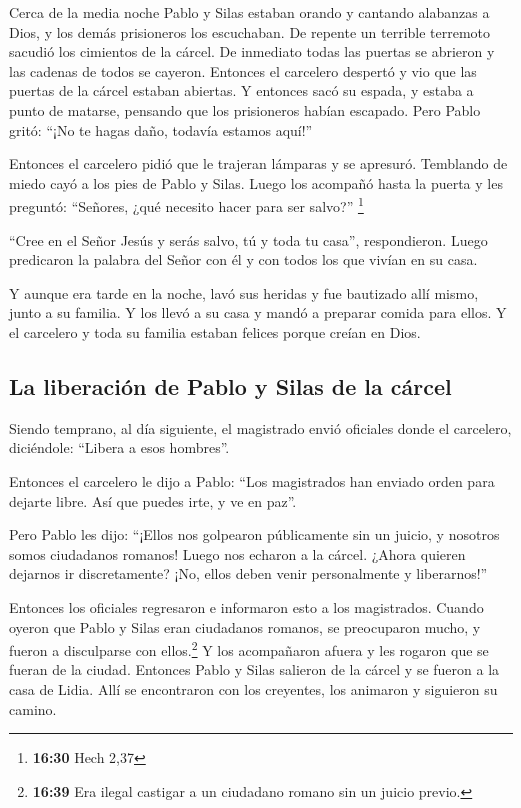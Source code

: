  Cerca de la media noche Pablo y Silas estaban orando y
cantando alabanzas a Dios, y los demás prisioneros los escuchaban.
 De repente un terrible terremoto sacudió los cimientos
de la cárcel. De inmediato todas las puertas se abrieron y las cadenas
de todos se cayeron.  Entonces el carcelero despertó y
vio que las puertas de la cárcel estaban abiertas. Y entonces sacó su
espada, y estaba a punto de matarse, pensando que los prisioneros habían
escapado.  Pero Pablo gritó: ``¡No te hagas daño, todavía
estamos aquí!''

 Entonces el carcelero pidió que le trajeran lámparas y
se apresuró. Temblando de miedo cayó a los pies de Pablo y Silas.
 Luego los acompañó hasta la puerta y les preguntó:
``Señores, ¿qué necesito hacer para ser salvo?'' \footnote{\textbf{16:30}
  Hech 2,37}

 ``Cree en el Señor Jesús y serás salvo, tú y toda tu
casa'', respondieron.  Luego predicaron la palabra del
Señor con él y con todos los que vivían en su casa.

 Y aunque era tarde en la noche, lavó sus heridas y fue
bautizado allí mismo, junto a su familia.  Y los llevó a
su casa y mandó a preparar comida para ellos. Y el carcelero y toda su
familia estaban felices porque creían en Dios.

\hypertarget{la-liberaciuxf3n-de-pablo-y-silas-de-la-cuxe1rcel}{%
\subsection{La liberación de Pablo y Silas de la
cárcel}\label{la-liberaciuxf3n-de-pablo-y-silas-de-la-cuxe1rcel}}

 Siendo temprano, al día siguiente, el magistrado envió
oficiales donde el carcelero, diciéndole: ``Libera a esos hombres''.

 Entonces el carcelero le dijo a Pablo: ``Los magistrados
han enviado orden para dejarte libre. Así que puedes irte, y ve en
paz''.

 Pero Pablo les dijo: ``¡Ellos nos golpearon públicamente
sin un juicio, y nosotros somos ciudadanos romanos! Luego nos echaron a
la cárcel. ¿Ahora quieren dejarnos ir discretamente? ¡No, ellos deben
venir personalmente y liberarnos!''

 Entonces los oficiales regresaron e informaron esto a
los magistrados. Cuando oyeron que Pablo y Silas eran ciudadanos
romanos, se preocuparon mucho,  y fueron a disculparse
con ellos.\footnote{\textbf{16:39} Era ilegal castigar a un ciudadano
  romano sin un juicio previo.} Y los acompañaron afuera y les rogaron
que se fueran de la ciudad.  Entonces Pablo y Silas
salieron de la cárcel y se fueron a la casa de Lidia. Allí se
encontraron con los creyentes, los animaron y siguieron su camino.

